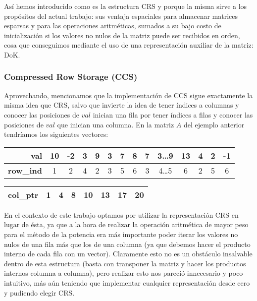 \par As\'i hemos introducido como es la estructura CRS y porque la misma sirve a
los prop\'ositos del actual trabajo: sus ventaja espaciales para almacenar
matrices esparsas y para las operaciones aritm\'eticas, sumados a su bajo costo
de inicializaci\'on si los valores no nulos de la matriz puede ser recibidos en
orden, cosa que conseguimos mediante el uso de una representaci\'on auxiliar de
la matriz: DoK.

\subsubsection*{Compressed Row Storage (CCS)}
\par Aprovechando, mencionamos que la implementaci\'on de CCS sigue exactamente
la misma idea que CRS, salvo que invierte la idea de tener \'indices a columnas
y conocer las posiciones de $val$ inician una fila por tener \'indices a filas y
conocer las posiciones de $val$ que inician una columna. En la matriz $A$ del
ejemplo anterior tendr\'iamos los siguientes vectores\cite{netlib_ccs}:

\begin{table}[h]
    \begin{tabular}{|r|c|c|c|c|c|c|c|c|c|c|c|c|c|}
        \hline
        \textbf{val}&10&-2&3&9&3&7&8&7&3\dots 9&13&4&2&-1\\
        \hline
        \textbf{row\_ind}&1&2&4&2&3&5&6&3&4\dots 5&6&2&5&6\\
        \hline
    \end{tabular}
    \newline
    \vspace*{1ex}
    \newline
    \begin{tabular}{|r|c|c|c|c|c|c|c|}
        \hline
        \textbf{col\_ptr}&1&4&8&10&13&17&20\\
        \hline
    \end{tabular}
\end{table}

\par En el contexto de este trabajo optamos por utilizar la representaci\'on CRS
en lugar de \'esta, ya que a la hora de realizar la operaci\'on aritm\'etica de
mayor peso para el m\'etodo de la potencia era m\'as importante poder iterar los
valores no nulos de una fila m\'as que los de una columna (ya que debemos hacer
el producto interno de cada fila con un vector). Claramente esto no es un
obst\'aculo insalvable dentro de esta estructura (basta con transponer la
matriz y hacer los productos internos columna a columna), pero realizar esto nos
pareci\'o innecesario y poco intuitivo, m\'as a\'un teniendo que implementar
cualquier representaci\'on desde cero y pudiendo elegir CRS.


